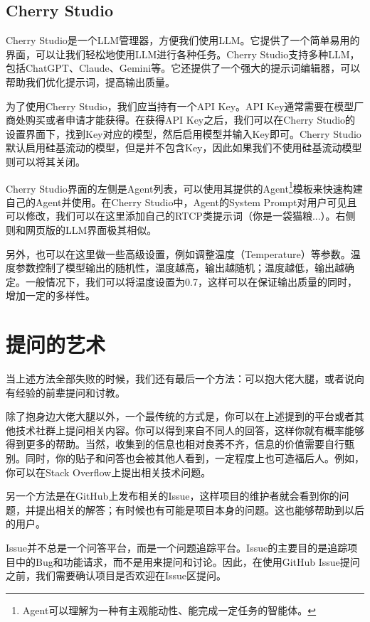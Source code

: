 \subsection{Cherry Studio}

Cherry Studio是一个LLM管理器，方便我们使用LLM。它提供了一个简单易用的界面，可以让我们轻松地使用LLM进行各种任务。Cherry Studio支持多种LLM，包括ChatGPT、Claude、Gemini等。它还提供了一个强大的提示词编辑器，可以帮助我们优化提示词，提高输出质量。

为了使用Cherry Studio，我们应当持有一个API Key。API Key通常需要在模型厂商处购买或者申请才能获得。在获得API Key之后，我们可以在Cherry Studio的设置界面下，找到Key对应的模型，然后启用模型并输入Key即可。Cherry Studio默认启用硅基流动的模型，但是并不包含Key，因此如果我们不使用硅基流动模型则可以将其关闭。

Cherry Studio界面的左侧是Agent列表，可以使用其提供的Agent\footnote{Agent可以理解为一种有主观能动性、能完成一定任务的智能体。}模板来快速构建自己的Agent并使用。在Cherry Studio中，Agent的System Prompt对用户可见且可以修改，我们可以在这里添加自己的RTCP类提示词（你是一袋猫粮...）。右侧则和网页版的LLM界面极其相似。

另外，也可以在这里做一些高级设置，例如调整温度（Temperature）等参数。温度参数控制了模型输出的随机性，温度越高，输出越随机；温度越低，输出越确定。一般情况下，我们可以将温度设置为0.7，这样可以在保证输出质量的同时，增加一定的多样性。

\section{提问的艺术}

当上述方法全部失败的时候，我们还有最后一个方法：可以抱大佬大腿，或者说向有经验的前辈提问和讨教。

除了抱身边大佬大腿以外，一个最传统的方式是，你可以在上述提到的平台或者其他技术社群上提问相关内容。你可以得到来自不同人的回答，这样你就有概率能够得到更多的帮助。当然，收集到的信息也相对良莠不齐，信息的价值需要自行甄别。同时，你的贴子和问答也会被其他人看到，一定程度上也可造福后人。例如，你可以在Stack Overflow上提出相关技术问题。

另一个方法是在GitHub上发布相关的Issue，这样项目的维护者就会看到你的问题，并提出相关的解答；有时候也有可能是项目本身的问题。这也能够帮助到以后的用户。

\begin{caution}
  Issue并不总是一个问答平台，而是一个问题追踪平台。Issue的主要目的是追踪项目中的Bug和功能请求，而不是用来提问和讨论。因此，在使用GitHub Issue提问之前，我们需要确认项目是否欢迎在Issue区提问。
\end{caution}

